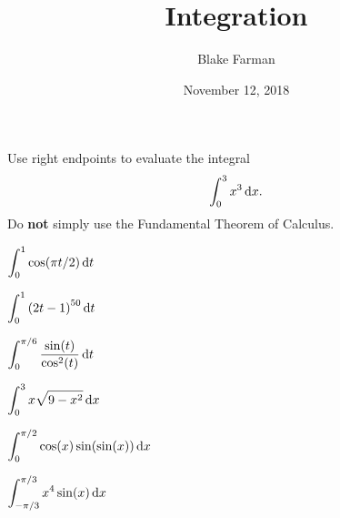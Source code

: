 \documentclass[10pt]{amsart}
\title{Integration}
\date{November 12, 2018}
\author{Blake Farman}
\begin{document}
\maketitle

\makenameslot

\begin{thm}
  Use right endpoints to evaluate the integral
  \[\int_0^3 x^3 \dif x.\]
  Do \textbf{not} simply use the Fundamental Theorem of Calculus.
\end{thm}

\begin{multicols}{2}
  \begin{thm}
    \(\displaystyle{\int_0^1\cos(\pi t/2)\dif t}\)
  \end{thm}

  \begin{thm}
    \(\displaystyle{\int_0^1 \left(2t - 1\right)^{50} \dif t}\)
  \end{thm}
\end{multicols}

\vspace{2in}

\begin{multicols}{2}
  \begin{thm}
    \(\displaystyle{\int_0^{\pi/6} \frac{\sin(t)}{\cos^2(t)}\dif t}\)
  \end{thm}

  \begin{thm}
    \(\displaystyle{\int_0^3 x\sqrt{9 - x^2}\dif x}\)
  \end{thm}
\end{multicols}

\vspace{2in}

\begin{multicols}{2}
  \begin{thm}
    \(\displaystyle{\int_0^{\pi/2} \cos(x) \sin(\sin(x)) \dif x}\)
  \end{thm}

  \begin{thm}
    \(\displaystyle{\int_{-\pi/3}^{\pi/3} x^4\sin(x) \dif x}\)
  \end{thm}
\end{multicols}
\end{document}
